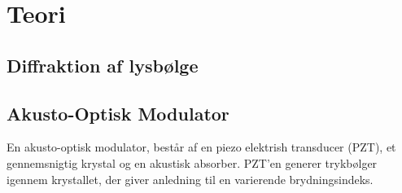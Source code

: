 \documentclass[main]{subfiles}
\begin{document}
\section{Teori}
\subsection{Diffraktion  af lysbølge}




\subsection{Akusto-Optisk Modulator}
En akusto-optisk modulator, består af en piezo elektrish transducer (PZT), et gennemsnigtig krystal og en akustisk absorber. PZT'en generer trykbølger igennem krystallet, der giver anledning til en varierende brydningsindeks. 
\end{document}
